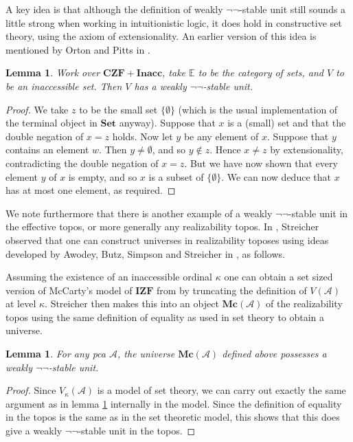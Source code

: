\documentclass[a4paper]{amsart}
\newtheorem{lemma}[theorem]{Lemma}
\theoremstyle{definition}
\newcommand{\cat}[1]{\mathbb{#1}}
\newcommand{\set}{\mathbf{Set}}
\newcommand{\czf}{\mathbf{CZF}}
\newcommand{\inacc}{\mathbf{Inacc}}
\newcommand{\mc}{\mathbf{Mc}}
\begin{document}
A key idea is that although the definition of weakly
$\neg \neg$-stable unit still sounds a little strong when working in
intuitionistic logic, it does hold in constructive set theory, using
the axiom of extensionality. An earlier version of this idea is
mentioned by Orton and Pitts in \cite[Remark
8.7]{pittsortoncubtopos}.
\begin{lemma}
  \label{lem:czfwkstbunit}
  Work over $\czf + \inacc$, take $\cat{E}$ to be the category of
  sets, and $V$ to be an inaccessible set. Then $V$ has a weakly $\neg
  \neg$-stable unit.
\end{lemma}

\begin{proof}
  We take $z$ to be the small set $\{\emptyset\}$ (which is
  the usual implementation of the terminal object in $\set$
  anyway). Suppose that $x$ is a (small) set and that the double
  negation of $x = z$ holds. Now let $y$ be any element of
  $x$. Suppose that $y$ contains an element $w$. Then $y \neq
  \emptyset$, and so $y \notin z$. Hence $x \neq z$ by extensionality,
  contradicting the double negation of $x = z$. But we have now shown
  that every element $y$ of $x$ is empty, and so $x$ is a subset of
  $\{\emptyset\}$. We can now deduce that $x$ has at most one element,
  as required.
\end{proof}

We note furthermore that there is another example of a weakly
$\neg \neg$-stable unit in the effective topos, or more generally any
realizability topos. In \cite[Section
3]{streicherunivtop}, Streicher observed that one can construct
universes in realizability toposes using ideas developed by Awodey,
Butz, Simpson and Streicher in \cite{abss}, as follows.

Assuming the existence of an inaccessible ordinal $\kappa$ one can
obtain a set sized version of McCarty's model of $\mathbf{IZF}$ from
\cite{mccarty} by truncating the definition of $V(\mathcal{A})$ at
level $\kappa$. Streicher then makes this into an object
$\mc(\mathcal{A})$ of the realizability topos using the same
definition of equality as used in set theory to obtain a universe.

\begin{lemma}
  \label{lem:mccartyhasnegnegunit}
  For any pca $\mathcal{A}$, the universe $\mc(\mathcal{A})$ defined
  above possesses a weakly $\neg \neg$-stable unit.
\end{lemma}

\begin{proof}
  Since $V_\kappa(\mathcal{A})$ is a model of set theory, we can carry
  out exactly the same argument as in lemma \ref{lem:czfwkstbunit}
  internally in the model. Since the definition of equality in the
  topos is the same as in the set theoretic model, this shows that
  this does give a weakly $\neg \neg$-stable unit in the topos.
\end{proof}
\end{document}
